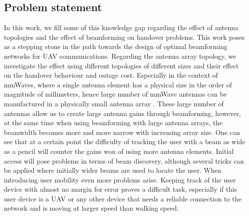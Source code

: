 \documentclass[conference,twocolumn]{IEEEtran}
\begin{document}
\subsection{Problem statement}
\par In this work, we fill some of this knowledge gap regarding the effect of antenna topologies and the effect of beamforming on handover problems. This work poses as a stepping stone in the path towards the design of optimal beamforming networks for UAV communications. Regarding the antenna array topology, we investigate the effect using different topologies of different sizes and their effect on the handover behaviour and outage cost. Especially in the context of mmWaves, where a single antenna element has a physical size in the order of magnitude of millimeters, hence large number of mmWave antennas can be manufactured in a physically small antenna array \cite{Rappaport2013, Colpaert2020}. These large number of antennas allow us to create large antenna gains through beamforming, however, at the same time when using beamforming with large antenna arrays, the beamwidth becomes more and more narrow with increasing array size. One can see that at a certain point the difficulty of tracking the user with a beam as wide as a pencil will counter the gains won of using more antenna elements. Initial access will  pose problems in terms of beam discovery, although several tricks can be applied where initially wider beams are used to locate the user. When introducing user mobility even more problems arise. Keeping track of the user device with almost no margin for error proves a difficult task, especially if this user device is a UAV or any other device that needs a reliable connection to the network and is moving at larger speed than walking speed. 
\end{document}
